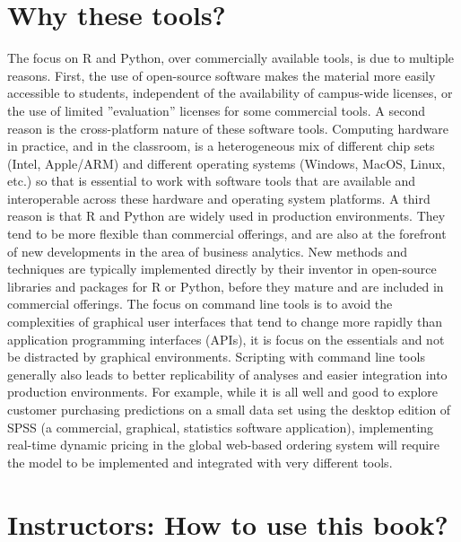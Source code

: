 \section*{Why these tools?}

The focus on R and Python, over commercially available tools, is due to multiple reasons. First, the use of open-source software makes the material more easily accessible to students, independent of the availability of campus-wide licenses, or the use of limited ''evaluation'' licenses for some commercial tools. A second reason is the cross-platform nature of these software tools. Computing hardware in practice, and in the classroom, is a heterogeneous mix of different chip sets (Intel, Apple/ARM) and different operating systems (Windows, MacOS, Linux, etc.) so that is essential to work with software tools that are available and interoperable across these hardware and operating system platforms. A third reason is that R and Python are widely used in production environments. They tend to be more flexible than commercial offerings, and are also at the forefront of new developments in the area of business analytics. New methods and techniques are typically implemented directly by their inventor in open-source libraries and packages for R or Python, before they mature and are included in commercial offerings. The focus on command line tools is to avoid the complexities of graphical user interfaces that tend to change more rapidly than application programming interfaces (APIs), it is focus on the essentials and not be distracted by graphical environments. Scripting with command line tools generally also leads to better replicability of analyses and easier integration into production environments. For example, while it is all well and good to explore customer purchasing predictions on a small data set using the desktop edition of SPSS (a commercial, graphical, statistics software application), implementing real-time dynamic pricing in the global web-based ordering system will require the model to be implemented and integrated with very different tools.

\section*{Instructors: How to use this book?}

